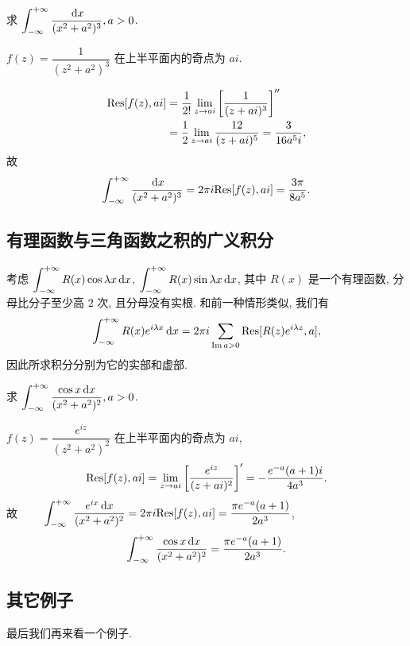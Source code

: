 \begin{example}
	求 $\displaystyle\int_{-\infty}^{+\infty}\frac{\,\mathrm{d} x}{(x^2+a^2)^3},a>0$.
\end{example}

\begin{solution}
	$f(z)=\dfrac1{(z^2+a^2)^3}$ 在上半平面内的奇点为 $ai$.

	{
		\begin{align*}
		{\mathrm{Res}}[f(z),ai]&=\frac1{2!}\lim_{z\to ai}\left[\frac1{(z+ai)^3}\right]''\\
		&=\frac{1}{2}\lim_{z\to ai}\frac{12}{(z+ai)^5}=\frac{3}{16a^5i},
		\end{align*}故
		\[\int_{-\infty}^{+\infty}\frac{\,\mathrm{d} x}{(x^2+a^2)^3}
	=2\pi i{\mathrm{Res}}[f(z),ai]=\frac{3\pi}{8a^5}.\]
	}
\end{solution}

\subsection{有理函数与三角函数之积的广义积分}

考虑 $\displaystyle\int_{-\infty}^{+\infty}R(x)\cos{\lambda x}\,\mathrm{d} x$, $\displaystyle\int_{-\infty}^{+\infty}R(x)\sin{\lambda x}\,\mathrm{d} x$, 其中 $R(x)$ 是一个有理函数, 分母比分子至少高 $2$ 次, 且分母没有实根.
和前一种情形类似, 我们有
	\[\int_{-\infty}^{+\infty}R(x)e^{i\lambda x}\,\mathrm{d} x
	=2\pi i\sum_{\operatorname{Im} a>0}{\mathrm{Res}}[R(z)e^{i\lambda z},a],\]
因此所求积分分别为它的实部和虚部.


\begin{example}
	求 $\displaystyle\int_{-\infty}^{+\infty}\frac{\cos x\,\mathrm{d} x}{(x^2+a^2)^2}, a>0$.
\end{example}

\begin{solution}
	$f(z)=\dfrac{e^{iz}}{(z^2+a^2)^2}$ 在上半平面内的奇点为 $ai$,
	{
		\[{\mathrm{Res}}[f(z),ai]=\lim_{z\to ai}\left[\frac{e^{iz}}{(z+ai)^2}\right]'=-\frac{e^{-a}(a+1)i}{4a^3}.\]故
		$\displaystyle\qquad \int_{-\infty}^{+\infty}\frac{e^{ix}\,\mathrm{d} x}{(x^2+a^2)^2}=2\pi i {\mathrm{Res}}[f(z),ai]=\frac{\pi e^{-a}(a+1)}{2a^3}$,
		\[\int_{-\infty}^{+\infty}\frac{\cos x\,\mathrm{d} x}{(x^2+a^2)^2}=\frac{\pi e^{-a}(a+1)}{2a^3}.\]
	}
\end{solution}

\subsection{其它例子}

最后我们再来看一个例子.

